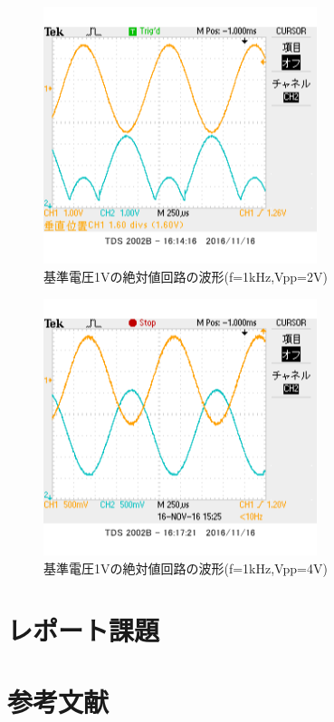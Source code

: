 \documentclass[11pt,a4j]{jsarticle}
\begin{document}
  \begin{figure}[htbp]
  \centering
  \includegraphics[width=8cm,clip]{2_abs_Vr1_f1V2sin_ViVo.png}
  \caption{基準電圧1Vの絶対値回路の波形(f=1kHz,Vpp=2V)}
  \label{fig:2_Vr1_2}
 \end{figure}%
  
  
  \begin{figure}[htbp]
  \centering
  \includegraphics[width=8cm,clip]{2_abs_Vr1_f1V4sin_ViVo.png}
  \caption{基準電圧1Vの絶対値回路の波形(f=1kHz,Vpp=4V)}
  \label{fig:2_Vr1_4}
 \end{figure}%
  
 \section{レポート課題} 
  
  
 \section{参考文献}
  
  
  
\end{document}
